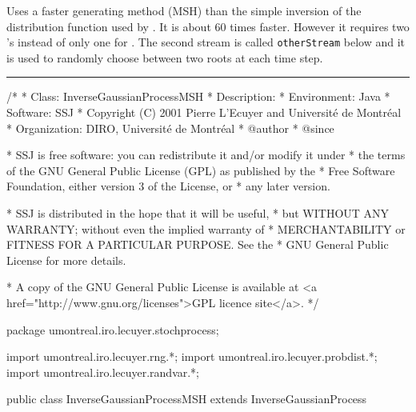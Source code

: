
Uses a faster generating method (MSH) \cite{rMIC76a} 
than the simple inversion of the distribution function
used by  .  
It is about 60 times faster.
However it requires two 
's instead
of only one for .
The second stream is called \texttt{otherStream} below and
it is used to randomly choose between two roots at each time step.


\bigskip\hrule\bigskip

\begin{code}
\begin{hide}
/*
 * Class:        InverseGaussianProcessMSH
 * Description:  
 * Environment:  Java
 * Software:     SSJ 
 * Copyright (C) 2001  Pierre L'Ecuyer and Université de Montréal
 * Organization: DIRO, Université de Montréal
 * @author       
 * @since

 * SSJ is free software: you can redistribute it and/or modify it under
 * the terms of the GNU General Public License (GPL) as published by the
 * Free Software Foundation, either version 3 of the License, or
 * any later version.

 * SSJ is distributed in the hope that it will be useful,
 * but WITHOUT ANY WARRANTY; without even the implied warranty of
 * MERCHANTABILITY or FITNESS FOR A PARTICULAR PURPOSE.  See the
 * GNU General Public License for more details.

 * A copy of the GNU General Public License is available at
   <a href="http://www.gnu.org/licenses">GPL licence site</a>.
 */
\end{hide}
package umontreal.iro.lecuyer.stochprocess;\begin{hide}
import umontreal.iro.lecuyer.rng.*;
import umontreal.iro.lecuyer.probdist.*;
import umontreal.iro.lecuyer.randvar.*;

\end{hide}

public class InverseGaussianProcessMSH extends InverseGaussianProcess \begin{hide} {

    // otherStream is used to decide between the two roots in method MSH.
    protected RandomStream otherStream;
    // Needed for the MSH method of generating inverse gaussian.
    protected NormalGen normalGen;
\end{hide}
\end{code}
